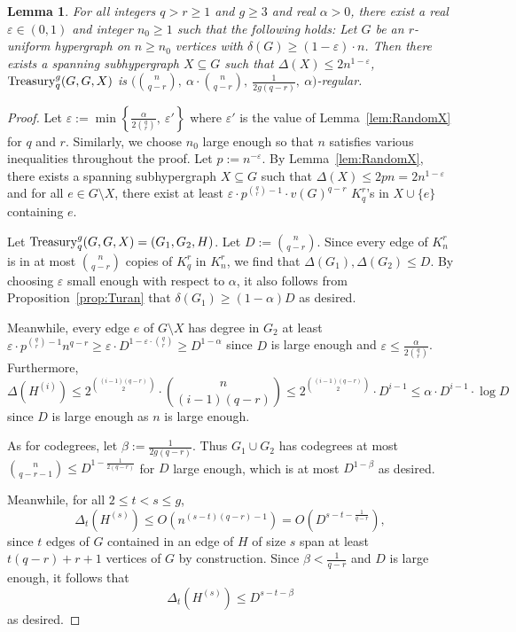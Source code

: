 \documentclass[11pt]{article}
\newcounter{i}
\theoremstyle{plain}
\newtheorem{lem}[thm]{Lemma}
\theoremstyle{plain} %
\theoremstyle{definition}
\begin{document}
\begin{lem}\label{lem:RandomXTreasury}
For all integers $q> r\ge 1$ and $g \ge 3$ and real $\alpha > 0$, there exist a real $\varepsilon \in (0,1)$ and integer $n_0 \ge 1$ such that the following holds: Let $G$ be an $r$-uniform hypergraph on $n\ge n_0$ vertices with $\delta(G)\ge (1-\varepsilon)\cdot n$. Then there exists a spanning subhypergraph  $X\subseteq G$ such that $\Delta(X)\le 2n^{1-\varepsilon}$, ${\rm Treasury}^g_q(G,G,X)$ is $\bigg(\binom{n}{q-r},~\alpha\cdot \binom{n}{q-r},~\frac{1}{2g(q-r)},~\alpha\bigg)$-regular. 
\end{lem}
\begin{proof}
Let $\varepsilon := \min \left\{\frac{\alpha}{2\binom{q}{r}},~\varepsilon'\right\}$ where $\varepsilon'$ is the value of Lemma~\ref{lem:RandomX} for $q$ and $r$. Similarly, we choose $n_0$ large enough so that $n$ satisfies various inequalities throughout the proof. Let $p:= n^{-\varepsilon}$. By Lemma~\ref{lem:RandomX}, there exists a spanning subhypergraph $X\subseteq G$ such that $\Delta(X)\le 2pn = 2n^{1-\varepsilon}$ and for all $e\in G\setminus X$, there exist at least $\varepsilon\cdot p^{\binom{q}{r}-1}\cdot v(G)^{q-r}$ $K_q^r$'s in $X\cup \{e\}$ containing $e$. 

Let ${\rm Treasury}_q^g(G,G,X) = (G_1,G_2,H)$. Let $D:= \binom{n}{q-r}$. Since every edge of $K_n^r$ is in at most $\binom{n}{q-r}$ copies of $K_q^r$ in $K_n^r$, we find that $\Delta(G_1),\Delta(G_2) \le D$. By choosing $\varepsilon$ small enough with respect to $\alpha$, it also follows from Proposition~\ref{prop:Turan} that $\delta(G_1)\ge (1-\alpha)D$ as desired. 

Meanwhile, every edge $e$ of $G\setminus X$ has degree in $G_2$ at least $\varepsilon \cdot p^{\binom{q}{r}-1} n^{q-r} \ge \varepsilon \cdot D^{1-\varepsilon\cdot \binom{q}{r}} \ge D^{1-\alpha}$ since $D$ is large enough and $\varepsilon \le \frac{\alpha}{2\binom{q}{r}}$. Furthermore, $$\Delta\left(H^{(i)}\right) \le 2^{\binom{(i-1)(q-r)}{2}} \cdot \binom{n}{(i-1)(q-r)} \le 2^{\binom{(i-1)(q-r)}{2}} \cdot D^{i-1} \le \alpha\cdot D^{i-1}\cdot \log D$$ 
since $D$ is large enough as $n$ is large enough.

As for codegrees, let $\beta := \frac{1}{2g(q-r)}$. Thus $G_1\cup G_2$ has codegrees at most $\binom{n}{q-r-1} \le D^{1-\frac{1}{2(q-r)}}$ for $D$ large enough, which is at most $D^{1-\beta}$ as desired. 

Meanwhile, for all $2\le t < s \le g$, 
$$\Delta_{t}\left(H^{(s)}\right) \le O\left(n^{(s-t)(q-r)-1}\right) = O\left(D^{s-t - \frac{1}{q-r}}\right) ,$$
since $t$ edges of $G$ contained in an edge of $H$ of size $s$ span at least $t(q-r)+r+1$ vertices of $G$ by construction. Since $\beta < \frac{1}{q-r}$ and $D$ is large enough, it follows  that  
$$ \Delta_{t}\left(H^{(s)}\right) \le D^{s-t-\beta}$$
as desired. 


\end{proof}
\end{document}
